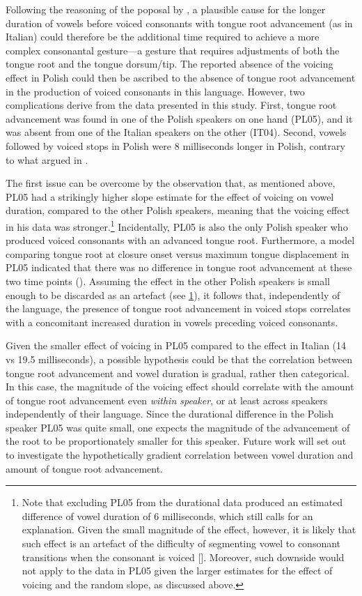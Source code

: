 \documentclass[authoryear, twocolumn]{elsarticle}
\begin{document}
Following the reasoning of the poposal by \citet{halle1967}, a plausible
cause for the longer duration of vowels before voiced consonants with
tongue root advancement (as in Italian) could therefore be the
additional time required to achieve a more complex consonantal
gesture---a gesture that requires adjustments of both the tongue root
and the tongue dorsum/tip. The reported absence of the voicing effect in
Polish could then be ascribed to the absence of tongue root advancement
in the production of voiced consonants in this language. However, two
complications derive from the data presented in this study. First,
tongue root advancement was found in one of the Polish speakers on one
hand (PL05), and it was absent from one of the Italian speakers on the
other (IT04). Second, vowels followed by voiced stops in Polish were 8
milliseconds longer in Polish, contrary to what argued in
\citet{keating1984}.

The first issue can be overcome by the observation that, as mentioned
above, PL05 had a strikingly higher slope estimate for the effect of
voicing on vowel duration, compared to the other Polish speakers,
meaning that the voicing effect in his data was
stronger.\footnote{\label{fn:polish-small} Note that excluding PL05 from the durational data produced an estimated difference of vowel duration of 6 milliseconds, which still calls for an explanation. Given the small magnitude of the effect, however, it is likely that such effect is an artefact of the difficulty of segmenting vowel to consonant transitions when the consonant is voiced []. Moreover, such downside would not apply to the data in PL05 given the larger estimates for the effect of voicing and the random slope, as discussed above.}
Incidentally, PL05 is also the only Polish speaker who produced voiced
consonants with an advanced tongue root. Furthermore, a model comparing
tongue root at closure onset versus maximum tongue displacement in PL05
indicated that there was no difference in tongue root advancement at
these two time points (). Assuming the effect in the other Polish
speakers is small enough to be discarded as an artefact (see
\cref{fn:polish-small}), it follows that, independently of the language,
the presence of tongue root advancement in voiced stops correlates with
a concomitant increased duration in vowels preceding voiced consonants.

Given the smaller effect of voicing in PL05 compared to the effect in
Italian (14 vs 19.5 milliseconds), a possible hypothesis could be that
the correlation between tongue root advancement and vowel duration is
gradual, rather then categorical. In this case, the magnitude of the
voicing effect should correlate with the amount of tongue root
advancement even \emph{within speaker}, or at least across speakers
independently of their language. Since the durational difference in the
Polish speaker PL05 was quite small, one expects the magnitude of the
advancement of the root to be proportionately smaller for this speaker.
Future work will set out to investigate the hypothetically gradient
correlation between vowel duration and amount of tongue root
advancement.
\end{document}
